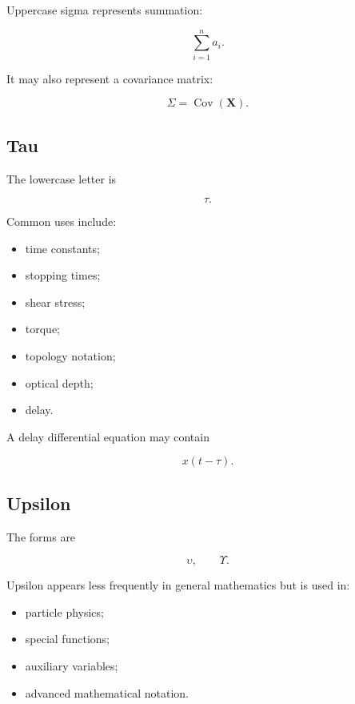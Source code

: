 Uppercase sigma represents summation:

\[
\boxed{
\sum_{i=1}^{n}a_i.
}
\]

It may also represent a covariance matrix:

\[
\boxed{
\Sigma
=
\operatorname{Cov}(\mathbf{X}).
}
\]

\subsection{Tau}
\label{subsec:greek-tau}

The lowercase letter is

\[
\boxed{
\tau.
}
\]

Common uses include:

\begin{itemize}
    \item time constants;
    \item stopping times;
    \item shear stress;
    \item torque;
    \item topology notation;
    \item optical depth;
    \item delay.
\end{itemize}

A delay differential equation may contain

\[
\boxed{
x(t-\tau).
}
\]

\subsection{Upsilon}
\label{subsec:greek-upsilon}

The forms are

\[
\boxed{
\upsilon,
\qquad
\Upsilon.
}
\]

Upsilon appears less frequently in general mathematics but is used in:

\begin{itemize}
    \item particle physics;
    \item special functions;
    \item auxiliary variables;
    \item advanced mathematical notation.
\end{itemize}

